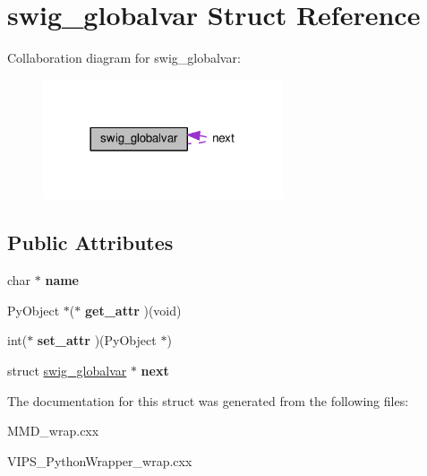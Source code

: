 \hypertarget{structswig__globalvar}{}\section{swig\+\_\+globalvar Struct Reference}
\label{structswig__globalvar}


Collaboration diagram for swig\+\_\+globalvar\+:
\nopagebreak
\begin{figure}[H]
\begin{center}
\leavevmode
\includegraphics[width=201pt]{structswig__globalvar__coll__graph}
\end{center}
\end{figure}
\subsection*{Public Attributes}
\begin{DoxyCompactItemize}
\item 
char $\ast$ {\bfseries name}\hypertarget{structswig__globalvar_afbf8fc90fadf3be87612f68d2af889f7}{}\label{structswig__globalvar_afbf8fc90fadf3be87612f68d2af889f7}

\item 
Py\+Object $\ast$($\ast$ {\bfseries get\+\_\+attr} )(void)\hypertarget{structswig__globalvar_a493a5974e1e2509ba48001f1a53d26ae}{}\label{structswig__globalvar_a493a5974e1e2509ba48001f1a53d26ae}

\item 
int($\ast$ {\bfseries set\+\_\+attr} )(Py\+Object $\ast$)\hypertarget{structswig__globalvar_a494e3d5a5f1fb694b7738fdd1ffdd657}{}\label{structswig__globalvar_a494e3d5a5f1fb694b7738fdd1ffdd657}

\item 
struct \hyperlink{structswig__globalvar}{swig\+\_\+globalvar} $\ast$ {\bfseries next}\hypertarget{structswig__globalvar_a9b2b63ce956d35d5270e6460e3a1601e}{}\label{structswig__globalvar_a9b2b63ce956d35d5270e6460e3a1601e}

\end{DoxyCompactItemize}


The documentation for this struct was generated from the following files\+:\begin{DoxyCompactItemize}
\item 
M\+M\+D\+\_\+wrap.\+cxx\item 
V\+I\+P\+S\+\_\+\+Python\+Wrapper\+\_\+wrap.\+cxx\end{DoxyCompactItemize}

